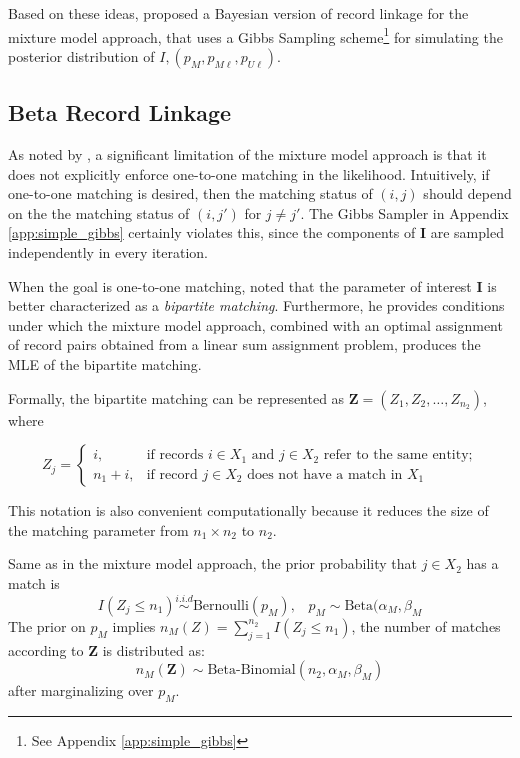 \documentclass[11pt,reqno]{amsart}
\newcommand\params{(p_M, p_{M\ell}, p_{U\ell})}
\begin{document}
Based on these ideas, \cite{larsen_rubin_2001} proposed a Bayesian version of record linkage for the mixture model approach, that uses a Gibbs Sampling scheme\footnote{See Appendix \ref{app:simple_gibbs}} for simulating the posterior distribution of $I,\params$. 

\subsection{Beta Record Linkage}  As noted by \cite{larsen_2005}, a significant limitation of the mixture model approach is that it does not explicitly enforce one-to-one matching in the likelihood.  Intuitively, if one-to-one matching is desired, then the matching status of $(i,j)$ should depend on the the matching status of $(i,j')$ for $j\neq j'$.  The Gibbs Sampler in Appendix \ref{app:simple_gibbs} certainly violates this, since the components of $\mathbf{I}$ are sampled independently in every iteration.
 
When the goal is one-to-one matching, \cite{sadinle_2017} noted that the parameter of interest $\mathbf{I}$ is better characterized as a \textit{bipartite matching}.   Furthermore, he provides conditions under which the mixture model approach, combined with an optimal assignment of record pairs obtained from a linear sum assignment problem, produces the MLE of the bipartite matching. 

Formally, the bipartite matching can be represented as $\mathbf{Z}= (Z_1, Z_2,\dots, Z_{n_2})$, where

\[ Z_j = \begin{cases} i, & \text{if records $i\in X_1$ and $j\in X_2$ refer to the same entity;} \\
				n_1+i, & \text{if record $j\in X_2$ does not have a match in $X_1$} \end{cases} \]

This notation is also convenient computationally because it reduces the size of the matching parameter from $n_1\times n_2$ to $n_2$. 

Same as in the mixture model approach, the prior probability that $j \in X_2$ has a match is
\begin{equation} I(Z_j \leq n_1)  \overset{i.i.d}{\sim} \text{Bernoulli}(p_M), \hspace{10pt} p_M \sim \text{Beta}(\alpha_{M}, \beta_{M} \label{cond1} \end{equation}
The prior on $p_M$ implies $n_{M}(Z) = \sum_{j=1}^{n_2} I(Z_j \leq n_1)$, the number of matches according to $\mathbf{Z}$ is distributed as:
\begin{equation} n_{M}(\mathbf{Z}) \sim \text{Beta-Binomial}(n_2, \alpha_{M}, \beta_{M}) \end{equation}
after marginalizing over $p_M$.
\end{document}

